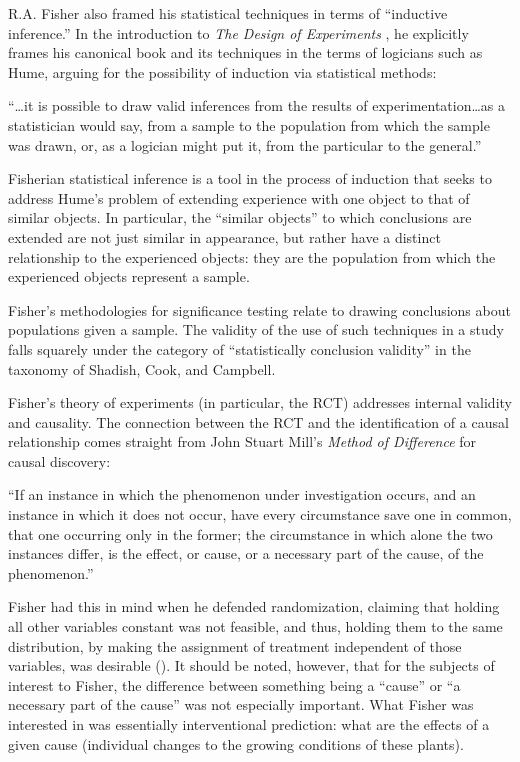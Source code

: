 \documentclass[a4paper,12pt]{article}
\begin{document}
R.A. Fisher also framed his statistical techniques in terms of ``inductive inference.'' In the introduction to \textit{The Design of Experiments} \parencite*{Fisher1935}, he explicitly frames his canonical book and its techniques in the terms of logicians such as Hume, arguing for the possibility of induction via statistical methods:
%
\begin{displayquote}
``\ldots it is possible to draw valid inferences from the results of experimentation\ldots as a statistician would say, from a sample to the population from which the sample was drawn, or, as a logician might put it, from the particular to the general.'' \parencite{Fisher1935}
\end{displayquote}

Fisherian statistical inference is a tool in the process of induction that seeks to address Hume's problem of extending experience with one object to that of similar objects. In particular, the ``similar objects'' to which conclusions are extended are not just similar in appearance, but rather have a distinct relationship to the experienced objects: they are the population from which the experienced objects represent a sample.

Fisher's methodologies for significance testing relate to drawing conclusions about populations given a sample. The validity of the use of such techniques in a study falls squarely under the category of ``statistically conclusion validity'' in the taxonomy of Shadish, Cook, and Campbell.

Fisher's theory of experiments (in particular, the RCT) addresses internal validity and causality. The connection between the RCT and the identification of a causal relationship comes straight from John Stuart Mill's \parencite*{mill1884} \textit{Method of Difference} for causal discovery:

\begin{displayquote}
  ``If an instance in which the phenomenon under investigation occurs, and an instance in which it does not occur, have every circumstance save one in common, that one occurring only in the former; the circumstance in which alone the two instances differ, is the effect, or cause, or a necessary part of the cause, of the phenomenon.''
\end{displayquote}

Fisher \parencite*{Fisher1935} had this in mind when he defended randomization, claiming that holding all other variables constant was not feasible, and thus, holding them to the same distribution, by making the assignment of treatment independent of those variables, was desirable (\cite{Rosenbaum2005}). It should be noted, however, that for the subjects of interest to Fisher, the difference between something being a ``cause'' or ``a necessary part of the cause'' was not especially important. What Fisher was interested in was essentially interventional prediction: what are the effects of a given cause (individual changes to the growing conditions of these plants).
\end{document}
